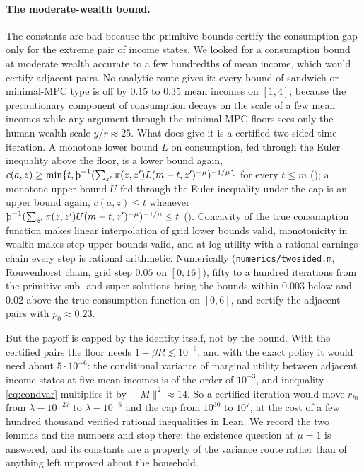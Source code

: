 \paragraph{The moderate-wealth bound.} The constants are bad because the primitive bounds
certify the consumption gap only for the extreme pair of income states. We looked for a
consumption bound at moderate wealth accurate to a few hundredths of mean income, which would
certify adjacent pairs. No analytic route gives it: every bound of sandwich or minimal-MPC type
is off by $0.15$ to $0.35$ mean incomes on $[1,4]$, because the precautionary component of
consumption decays on the scale of a few mean incomes while any argument through the
minimal-MPC floors sees only the human-wealth scale $y/r\approx25$. What does give it is a
certified two-sided time iteration. A monotone lower bound $L$ on consumption, fed through the
Euler inequality above the floor, is a lower bound again, $c(a,z)\ge\min\{t,\Thorn^{-1}
(\sum_{z'}\pi(z,z')L(m-t,z')^{-\mu})^{-1/\mu}\}$ for every $t\le m$
(); a monotone upper bound $U$ fed through the Euler
inequality under the cap is an upper bound again, $c(a,z)\le t$ whenever
$\Thorn^{-1}(\sum_{z'}\pi(z,z')U(m-t,z')^{-\mu})^{-1/\mu}\le t$
(). Concavity of the true consumption function makes
linear interpolation of grid lower bounds valid, monotonicity in wealth makes step upper bounds
valid, and at log utility with a rational earnings chain every step is rational arithmetic.
Numerically (\texttt{numerics/twosided.m}, Rouwenhorst chain, grid step $0.05$ on $[0,16]$),
fifty to a hundred iterations from the primitive sub- and super-solutions bring the bounds
within $0.003$ below and $0.02$ above the true consumption function on $[0,6]$, and certify the
adjacent pairs with $p_0\approx0.23$.

But the payoff is capped by the identity itself, not by the bound. With the certified pairs the
floor needs $1-\beta R\lesssim10^{-6}$, and with the exact policy it would need about
$5\cdot10^{-6}$: the conditional variance of marginal utility between adjacent income states at
five mean incomes is of the order of $10^{-3}$, and inequality \eqref{eq:condvar} multiplies it
by $\|M\|^2\approx14$. So a certified iteration would move $r_{hi}$ from $\lambda-10^{-27}$ to
$\lambda-10^{-6}$ and the cap from $10^{30}$ to $10^{7}$, at the cost of a few hundred thousand
verified rational inequalities in Lean. We record the two lemmas and the numbers and stop
there: the existence question at $\mu=1$ is answered, and its constants are a property of the
variance route rather than of anything left unproved about the household.

